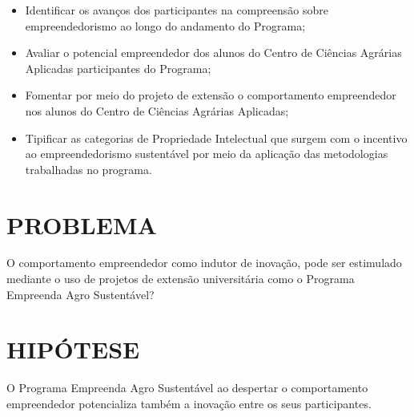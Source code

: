 \begin{itemize}
\item{Identificar os avanços dos participantes na compreensão sobre empreendedorismo ao longo do andamento do Programa;}

\item {Avaliar o potencial empreendedor dos alunos do Centro de Ciências Agrárias Aplicadas participantes do Programa;}
\item {Fomentar por meio do projeto de extensão o comportamento empreendedor nos alunos do Centro de Ciências Agrárias Aplicadas;}
\item {Tipificar as categorias de Propriedade Intelectual que surgem com o incentivo ao empreendedorismo sustentável por meio da aplicação das metodologias trabalhadas no programa.}
\end{itemize}


\section{PROBLEMA}

O comportamento empreendedor como indutor de inovação, pode ser estimulado mediante o uso de projetos de extensão universitária como o Programa Empreenda Agro Sustentável? 


\section{HIPÓTESE}

O Programa Empreenda Agro Sustentável ao despertar o comportamento empreendedor potencializa também a inovação entre os seus participantes.



